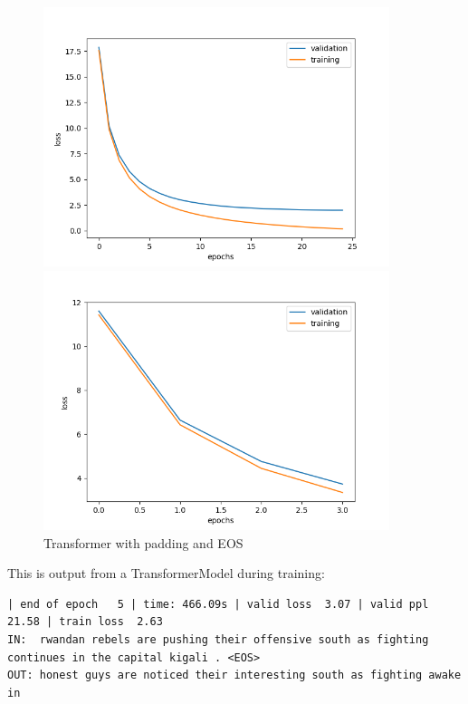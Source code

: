 \documentclass{article}
\begin{document}
\begin{figure}[h]
    \centering
    \begin{minipage}{0.45\textwidth}
        \includegraphics[width=0.9\textwidth]{transformer.png}
        \caption{%
            Transformer.png
        }\label{fig:transformer}
    \end{minipage}
    \begin{minipage}{0.45\textwidth}
        \includegraphics[width=0.9\textwidth]{transformer_padding-eos.png}
        \caption{%
            Transformer with padding and EOS
        }\label{fig:transformerPaddingEOS}
    \end{minipage}


\end{figure}


This is output from a TransformerModel during training:

\begin{verbatim}
| end of epoch   5 | time: 466.09s | valid loss  3.07 | valid ppl    21.58 | train loss  2.63
IN:  rwandan rebels are pushing their offensive south as fighting continues in the capital kigali . <EOS>
OUT: honest guys are noticed their interesting south as fighting awake in 
\end{verbatim}
\end{document}
